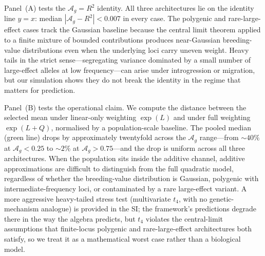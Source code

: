 \documentclass[9pt,twocolumn,twoside,lineno]{gsajnl}
\newcommand{\Ag}{\ensuremath{\mathcal{A}_{g}}\xspace}
\begin{document}
Panel~(A) tests the $\Ag = R^2$ identity. All three architectures lie on the identity line $y = x$: median $|\Ag - R^2| < 0.007$ in every case. The polygenic and rare-large-effect cases track the Gaussian baseline because the central limit theorem applied to a finite mixture of bounded contributions produces near-Gaussian breeding-value distributions even when the underlying loci carry uneven weight. Heavy tails in the strict sense---segregating variance dominated by a small number of large-effect alleles at low frequency---can arise under introgression or migration, but our simulation shows they do not break the identity in the regime that matters for prediction.

Panel~(B) tests the operational claim. We compute the distance between the selected mean under linear-only weighting $\exp(L)$ and under full weighting $\exp(L+Q)$, normalised by a population-scale baseline. The pooled median (green line) drops by approximately twentyfold across the $\Ag$ range---from $\sim 40\%$ at $\Ag < 0.25$ to $\sim 2\%$ at $\Ag > 0.75$---and the drop is uniform across all three architectures. When the population sits inside the additive channel, additive approximations are difficult to distinguish from the full quadratic model, regardless of whether the breeding-value distribution is Gaussian, polygenic with intermediate-frequency loci, or contaminated by a rare large-effect variant. A more aggressive heavy-tailed stress test (multivariate $t_4$, with no genetic-mechanism analogue) is provided in the SI; the framework's predictions degrade there in the way the algebra predicts, but $t_4$ violates the central-limit assumptions that finite-locus polygenic and rare-large-effect architectures both satisfy, so we treat it as a mathematical worst case rather than a biological model.

\end{document}
